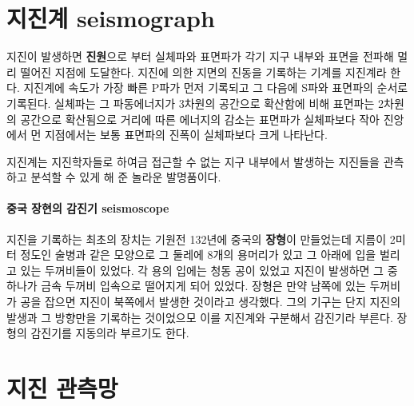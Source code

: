 \documentclass[12pt, a4paper, oneside]{book}
\begin{document}
		
		
		
		
		
	
	
		
	

















	\clearpage
	\section{지진계 seismograph}

		지진이 발생하면 \textbf{진원}으로 부터 실체파와 표면파가 각기 지구 내부와 표면을 전파해 멀리 떨어진 지점에 도달한다. 지진에 의한 지면의 진동을 기록하는 기계를 지진계라 한다.
		지진계에 속도가 가장 빠른 P파가 먼저 기록되고 그 다음에 S파와 표면파의 순서로 기록된다.
		실체파는 그 파동에너지가 3차원의 공간으로 확산함에 비해 표면파는 2차원의 공간으로 확산됨으로 거리에 따른 에너지의 감소는 표면파가 실체파보다 작아 진앙에서 먼 지점에서는 보통 표면파의 진폭이 실체파보다 크게 나타난다.
		
		지진계는 지진학자들로 하여금 접근할 수 없는 지구 내부에서 발생하는 지진들을 관측하고 분석할 수 있게 해 준 놀라운 발명품이다.
		
		\paragraph{중국 장현의 감진기 seismoscope}
		지진을 기록하는 최초의 장치는 기원전 132년에 중국의 \textbf{장형}이 만들었는데  지름이 2미터 정도인 술병과 같은 모양으로 그 둘레에 8개의 용머리가 있고 그 아래에 입을 벌리고 있는 두꺼비들이 있었다. 각 용의 입에는 청동 공이 있었고 지진이 발생하면 그 중 하나가 금속 두꺼비 입속으로 떨어지게 되어 있었다. 장형은 만약 남쪽에 있는 두꺼비가 공을 잡으면 지진이 북쪽에서 발생한 것이라고 생각했다. 그의 기구는 단지 지진의 발생과 그 방향만을 기록하는 것이었으모 이를 지진계와 구분해서 감진기라 부른다. 장형의 감진기를 지동의라 부르기도 한다.
		
		
		
		
		
		


	\clearpage
	\section{지진 관측망}
\end{document}
